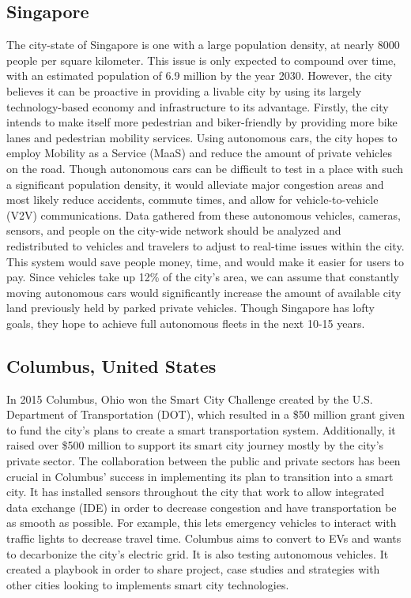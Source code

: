 \documentclass[12pt]{article}                         %
\begin{document}
\subsection{Singapore}
The city-state of Singapore is one with a large population density, at nearly 8000 people per square kilometer. This issue is only expected to compound over time, with an estimated population of 6.9 million by the year 2030. However, the city believes it can be proactive in providing a livable city by using its largely technology-based economy and infrastructure to its advantage. Firstly, the city intends to make itself more pedestrian and biker-friendly by providing more bike lanes and pedestrian mobility services. Using autonomous cars, the city hopes to employ Mobility as a Service (MaaS) and reduce the amount of private vehicles on the road. Though autonomous cars can be difficult to test in a place with such a significant population density, it would alleviate major congestion areas and most likely reduce accidents, commute times, and allow for vehicle-to-vehicle (V2V) communications. Data gathered from these autonomous vehicles, cameras, sensors, and people on the city-wide network should be analyzed and redistributed to vehicles and travelers to adjust to real-time issues within the city. This system would save people money, time, and would make it easier for users to pay. Since vehicles take up 12\% of the city’s area, we can assume that constantly moving autonomous cars would significantly increase the amount of available city land previously held by parked private vehicles. Though Singapore has lofty goals, they hope to achieve full autonomous fleets in the next 10-15 years.

\subsection{Columbus, United States}
In 2015 Columbus, Ohio won the Smart City Challenge created by the U.S. Department of Transportation (DOT), which resulted in a \$50 million grant given to fund the city’s plans to create a smart transportation system. Additionally, it raised over \$500 million to support its smart city journey mostly by the city’s private sector. The collaboration between the public and private sectors has been crucial in Columbus' success in implementing its plan to transition into a smart city. It has installed sensors throughout the city that work to allow integrated data exchange (IDE) in order to decrease congestion and  have transportation be as smooth as possible. For example, this lets emergency vehicles to interact with traffic lights to decrease travel time. Columbus aims to convert to EVs and wants to decarbonize the city’s electric grid. It is also testing autonomous vehicles. It created a playbook in order to share project, case studies and strategies with other cities looking to implements smart city technologies.
\end{document}
